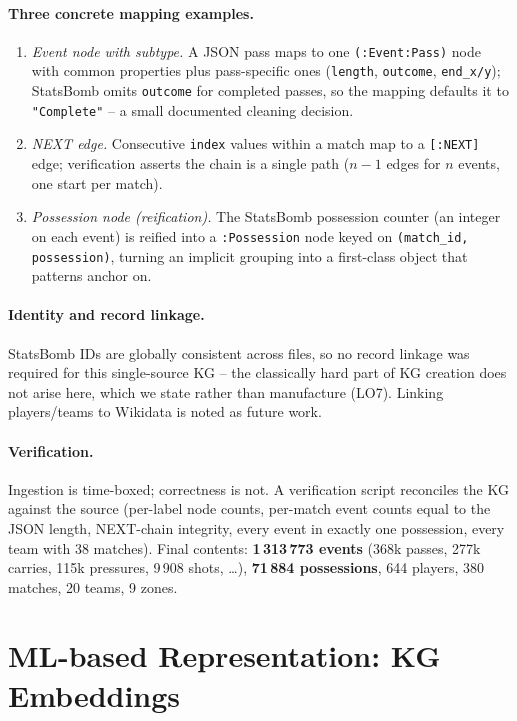 \documentclass[11pt,a4paper]{article}
\begin{document}
\paragraph{Three concrete mapping examples.}
\begin{enumerate}[itemsep=2pt]
  \item \emph{Event node with subtype.} A JSON pass maps to one
    \texttt{(:Event:Pass)} node with common properties plus pass-specific ones
    (\texttt{length}, \texttt{outcome}, \texttt{end\_x/y}); StatsBomb omits
    \texttt{outcome} for completed passes, so the mapping defaults it to
    \texttt{"Complete"} -- a small documented cleaning decision.
  \item \emph{NEXT edge.} Consecutive \texttt{index} values within a match map
    to a \texttt{[:NEXT]} edge; verification asserts the chain is a single path
    ($n-1$ edges for $n$ events, one start per match).
  \item \emph{Possession node (reification).} The StatsBomb possession counter
    (an integer on each event) is reified into a \texttt{:Possession} node keyed
    on \texttt{(match\_id, possession)}, turning an implicit grouping into a
    first-class object that patterns anchor on.
\end{enumerate}

\paragraph{Identity and record linkage.} StatsBomb IDs are globally consistent
across files, so no record linkage was required for this single-source KG -- the
classically hard part of KG creation does not arise here, which we state rather
than manufacture (LO7). Linking players/teams to Wikidata is noted as future
work.

\paragraph{Verification.} Ingestion is time-boxed; correctness is not. A
verification script reconciles the KG against the source (per-label node counts,
per-match event counts equal to the JSON length, NEXT-chain integrity, every
event in exactly one possession, every team with 38 matches). Final contents:
\textbf{1\,313\,773 events} (368k passes, 277k carries, 115k pressures, 9\,908
shots, \dots), \textbf{71\,884 possessions}, 644 players, 380 matches, 20 teams,
9 zones.

\section{ML-based Representation: KG Embeddings}
\end{document}
